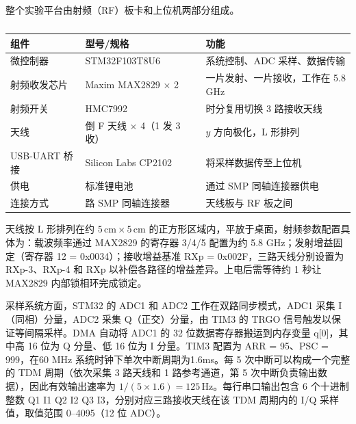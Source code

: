 整个实验平台由射频（RF）板卡和上位机两部分组成。

\begin{table}[htbp]
    \centering
    \caption{}
    \label{tab:hardware}
    {\setlength{\extrarowheight}{2pt}%
    \begin{tabularx}{\linewidth}{|>{\centering\arraybackslash}p{2.5cm}|>{\centering\arraybackslash}X|>{\centering\arraybackslash}X|}
        \hline
        \textbf{组件} & \textbf{型号/规格} & \textbf{功能} \\
        \hline
        微控制器 & STM32F103T8U6 & 系统控制、ADC 采样、数据传输 \\
        \hline
        射频收发芯片 & Maxim MAX2829 $\times$ 2 & 一片发射、一片接收，工作在 5.8 GHz \\
        \hline
        射频开关 & HMC7992 & 时分复用切换 3 路接收天线 \\
        \hline
        天线 & 倒 F 天线 $\times$ 4（1 发 3 收） & $y$ 方向极化，L 形排列 \\
        \hline
        USB-UART 桥接 & Silicon Labs CP2102 & 将采样数据传至上位机 \\
        \hline
        供电 & 标准锂电池 & 通过 SMP 同轴连接器供电 \\
        \hline
        连接方式 & 4 路 SMP 同轴连接器 & 天线板与 RF 板之间 \\
        \hline
    \end{tabularx}}
\end{table}

天线按 L 形排列在约 $5\,\text{cm} \times 5\,\text{cm}$ 的正方形区域内，平放于桌面，射频参数配置具体为：载波频率通过 MAX2829 的寄存器 3/4/5 配置为约 5.8 GHz；发射增益固定（寄存器 12 = 0x0034）；接收增益基准 RXp = 0x002F，三路天线分别设置为 RXp-3、RXp-4 和 RXp 以补偿各路径的增益差异。上电后需等待约 1 秒让 MAX2829 内部锁相环完成锁定。

采样系统方面，STM32 的 ADC1 和 ADC2 工作在双路同步模式，ADC1 采集 I（同相）分量，ADC2 采集 Q（正交）分量，由 TIM3 的 TRGO 信号触发以保证等间隔采样。DMA 自动将 ADC1 的 32 位数据寄存器搬运到内存变量 q[0]，其中高 16 位为 Q 分量、低 16 位为 I 分量。TIM3 配置为 ARR = 95、PSC = 999，在60 MHz 系统时钟下单次中断周期为1.6ms。每 5 次中断可以构成一个完整的 TDM 周期（依次采集 3 路天线和 1 路参考通道，第 5 次中断负责输出数据），因此有效输出速率为 $1/(5\times1.6) = 125\,\text{Hz}$。每行串口输出包含 6 个十进制整数 Q1 I1 Q2 I2 Q3 I3，分别对应三路接收天线在该 TDM 周期内的 I/Q 采样值，取值范围 0--4095（12 位 ADC）。

